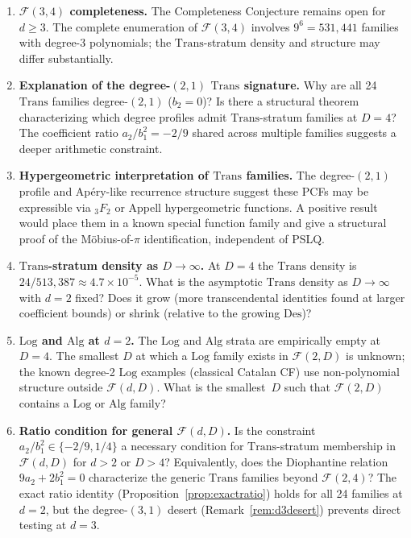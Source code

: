 \documentclass[12pt, reqno]{amsart}
\theoremstyle{definition}
\theoremstyle{remark}
\newcommand{\Log}{\mathrm{Log}}
\newcommand{\Alg}{\mathrm{Alg}}
\newcommand{\Trans}{\mathrm{Trans}}
\newcommand{\Des}{\mathrm{Des}}
\begin{document}
\begin{enumerate}[\bfseries(P1)]
\item \textbf{$\mathcal{F}(3,4)$ completeness.}
The Completeness Conjecture remains open for $d\ge 3$.
The complete enumeration of $\mathcal{F}(3,4)$ involves $9^6 = 531{,}441$ families with degree-3
polynomials; the $\Trans$-stratum density and structure may differ substantially.

\item \textbf{Explanation of the degree-$(2,1)$ $\Trans$ signature.}
Why are all 24 $\Trans$
families degree-$(2,1)$ ($b_2 = 0$)? Is there a structural theorem characterizing
which degree profiles admit $\Trans$-stratum families at $D=4$? The coefficient
ratio $a_2/b_1^2 = -2/9$ shared across multiple families suggests a deeper
arithmetic constraint.

\item \textbf{Hypergeometric interpretation of $\Trans$ families.}
The degree-$(2,1)$
profile and Ap\'ery-like recurrence structure suggest these PCFs may be
expressible via ${}_3F_2$ or Appell hypergeometric functions. A positive result
would place them in a known special function family and give a structural
proof of the M\"obius-of-$\pi$ identification, independent of PSLQ.

\item \textbf{$\Trans$-stratum density as $D \to \infty$.}
At $D=4$ the $\Trans$ density is
$24/513{,}387 \approx 4.7 \times 10^{-5}$. What is the asymptotic $\Trans$ density as $D \to \infty$
with $d=2$ fixed? Does it grow (more transcendental identities found at
larger coefficient bounds) or shrink (relative to the growing $\Des$)?

\item \textbf{$\Log$ and $\Alg$ at $d=2$.}
The $\Log$ and $\Alg$ strata are empirically empty
at $D=4$. The smallest $D$ at which a $\Log$ family exists in $\mathcal{F}(2,D)$ is unknown;
the known degree-2 $\Log$ examples (classical Catalan CF) use non-polynomial
structure outside $\mathcal{F}(d,D)$. What is the smallest~$D$ such that $\mathcal{F}(2,D)$ contains
a $\Log$ or $\Alg$ family?

\item \textbf{Ratio condition for general $\mathcal{F}(d,D)$.}
Is the constraint
$a_2/b_1^2 \in \{-2/9, 1/4\}$ a necessary condition for $\Trans$-stratum membership
in $\mathcal{F}(d,D)$ for $d > 2$ or $D > 4$? Equivalently, does the Diophantine relation
$9a_2 + 2b_1^2 = 0$ characterize the generic $\Trans$ families beyond $\mathcal{F}(2,4)$?
The exact ratio identity (Proposition~\ref{prop:exactratio}) holds for all 24 families at $d=2$,
but the degree-$(3,1)$ desert (Remark~\ref{rem:d3desert}) prevents direct testing at $d=3$.


\end{enumerate}
\end{document}
